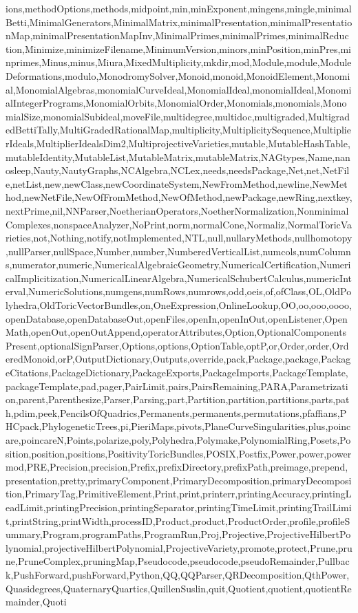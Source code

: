{ions,methodOptions,methods,midpoint,min,minExponent,mingens,mingle,minimalBetti,MinimalGenerators,MinimalMatrix,minimalPresentation,minimalPresentationMap,minimalPresentationMapInv,MinimalPrimes,minimalPrimes,minimalReduction,Minimize,minimizeFilename,MinimumVersion,minors,minPosition,minPres,minprimes,Minus,minus,Miura,MixedMultiplicity,mkdir,mod,Module,module,ModuleDeformations,modulo,MonodromySolver,Monoid,monoid,MonoidElement,Monomial,MonomialAlgebras,monomialCurveIdeal,MonomialIdeal,monomialIdeal,MonomialIntegerPrograms,MonomialOrbits,MonomialOrder,Monomials,monomials,MonomialSize,monomialSubideal,moveFile,multidegree,multidoc,multigraded,MultigradedBettiTally,MultiGradedRationalMap,multiplicity,MultiplicitySequence,MultiplierIdeals,MultiplierIdealsDim2,MultiprojectiveVarieties,mutable,MutableHashTable,mutableIdentity,MutableList,MutableMatrix,mutableMatrix,NAGtypes,Name,nanosleep,Nauty,NautyGraphs,NCAlgebra,NCLex,needs,needsPackage,Net,net,NetFile,netList,new,newClass,newCoordinateSystem,NewFromMethod,newline,NewMethod,newNetFile,NewOfFromMethod,NewOfMethod,newPackage,newRing,nextkey,nextPrime,nil,NNParser,NoetherianOperators,NoetherNormalization,NonminimalComplexes,nonspaceAnalyzer,NoPrint,norm,normalCone,Normaliz,NormalToricVarieties,not,Nothing,notify,notImplemented,NTL,null,nullaryMethods,nullhomotopy,nullParser,nullSpace,Number,number,NumberedVerticalList,numcols,numColumns,numerator,numeric,NumericalAlgebraicGeometry,NumericalCertification,NumericalImplicitization,NumericalLinearAlgebra,NumericalSchubertCalculus,numericInterval,NumericSolutions,numgens,numRows,numrows,odd,oeis,of,ofClass,OL,OldPolyhedra,OldToricVectorBundles,on,OneExpression,OnlineLookup,OO,oo,ooo,oooo,openDatabase,openDatabaseOut,openFiles,openIn,openInOut,openListener,OpenMath,openOut,openOutAppend,operatorAttributes,Option,OptionalComponentsPresent,optionalSignParser,Options,options,OptionTable,optP,or,Order,order,OrderedMonoid,orP,OutputDictionary,Outputs,override,pack,Package,package,PackageCitations,PackageDictionary,PackageExports,PackageImports,PackageTemplate,packageTemplate,pad,pager,PairLimit,pairs,PairsRemaining,PARA,Parametrization,parent,Parenthesize,Parser,Parsing,part,Partition,partition,partitions,parts,path,pdim,peek,PencilsOfQuadrics,Permanents,permanents,permutations,pfaffians,PHCpack,PhylogeneticTrees,pi,PieriMaps,pivots,PlaneCurveSingularities,plus,poincare,poincareN,Points,polarize,poly,Polyhedra,Polymake,PolynomialRing,Posets,Position,position,positions,PositivityToricBundles,POSIX,Postfix,Power,power,powermod,PRE,Precision,precision,Prefix,prefixDirectory,prefixPath,preimage,prepend,presentation,pretty,primaryComponent,PrimaryDecomposition,primaryDecomposition,PrimaryTag,PrimitiveElement,Print,print,printerr,printingAccuracy,printingLeadLimit,printingPrecision,printingSeparator,printingTimeLimit,printingTrailLimit,printString,printWidth,processID,Product,product,ProductOrder,profile,profileSummary,Program,programPaths,ProgramRun,Proj,Projective,ProjectiveHilbertPolynomial,projectiveHilbertPolynomial,ProjectiveVariety,promote,protect,Prune,prune,PruneComplex,pruningMap,Pseudocode,pseudocode,pseudoRemainder,Pullback,PushForward,pushForward,Python,QQ,QQParser,QRDecomposition,QthPower,Quasidegrees,QuaternaryQuartics,QuillenSuslin,quit,Quotient,quotient,quotientRemainder,Quoti}
